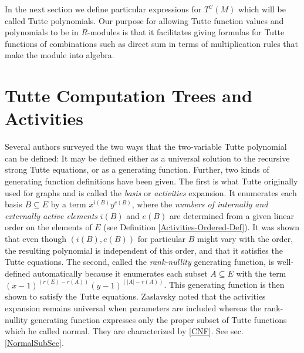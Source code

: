 \documentclass[12pt,leqno]{amsart}
\theoremstyle{remark}
\begin{document}
In the next section we define particular expressions for $T^{\mathcal{C}}(M)$
which will be called Tutte polynomials.   Our purpose for
allowing Tutte function values and polynomials to be in
$R$-modules is that it facilitates giving formulas for 
Tutte functions of combinations such as direct sum in
terms of multiplication rules that make the module into algebra.


\section{Tutte Computation Trees and Activities}
\label{Activity}

Several authors \cite{Ellis-Monaghan-Merino-1,Ellis-Monaghan-Traldi}
surveyed the two ways that the 
two-variable Tutte polynomial can be defined:  It 
may be defined either as a universal solution to the
recursive strong Tutte equations, or as a generating function.
Further, two kinds of generating function definitions have been given.
The first is what Tutte originally used for graphs 
\cite{TutteDich,TutteGraphBook} and is
called the \emph{basis} or \emph{activities}
expansion. It enumerates each basis $B\subseteq E$ 
by a term $x^{i(B)}y^{e(B)}$, where the 
\emph{numbers of internally and externally active elements} 
$i(B)$ and $e(B)$ are determined from a given linear order
on the elements of $E$ (see Definition \ref{Activities-Ordered-Def}).
It was shown that even though $(i(B),e(B))$ for particular $B$
might vary with the order, the resulting polynomial is
independent of this order, and that it satisfies the Tutte equations.
The second, called the \emph{rank-nullity} generating function, 
is well-defined automatically
because it enumerates each subset $A\subseteq E$ with
the term $(x-1)^{(r(E)-r(A))}(y-1)^{(|A|-r(A))}$.  
This generating function is then shown to satisfy the Tutte equations.
Zaslavsky noted that the activities expansion remains universal when parameters
are included whereas the rank-nullity generating function expresses only the
proper subset of Tutte functions which he called normal\cite{MR93a:05047}.
They are characterized by \eqref{CNF}.
See sec. \ref{NormalSubSec}.
\end{document}
